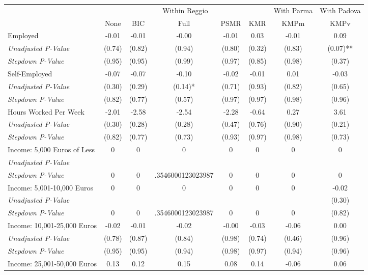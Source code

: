 \begin{tabular}{l c c c c c c c}
\toprule
& \multicolumn{5}{c}{Within Reggio} & With Parma & With Padova \\\cmidrule(lr){2-6} \cmidrule(lr){7-7} \cmidrule(lr){8-8}
 & None & BIC & Full & PSMR & KMR & KMPm & KMPv \\
\midrule
Employed & -0.01 & -0.01 & -0.00 & -0.01 & 0.03 & -0.01 & 0.09 \\
\quad \textit{Unadjusted P-Value} & (0.74) & (0.82) & (0.94) & (0.80) & (0.32) & (0.83) & (0.07)** \\
\quad \textit{Stepdown P-Value} & (0.95) & (0.95) & (0.99) & (0.97) & (0.85) & (0.98) & (0.37) \\
Self-Employed & -0.07 & -0.07 & -0.10 & -0.02 & -0.01 & 0.01 & -0.03 \\
\quad \textit{Unadjusted P-Value} & (0.30) & (0.29) & (0.14)* & (0.71) & (0.93) & (0.82) & (0.65) \\
\quad \textit{Stepdown P-Value} & (0.82) & (0.77) & (0.57) & (0.97) & (0.97) & (0.98) & (0.96) \\
Hours Worked Per Week & -2.01 & -2.58 & -2.54 & -2.28 & -0.64 & 0.27 & 3.61 \\
\quad \textit{Unadjusted P-Value} & (0.30) & (0.28) & (0.28) & (0.47) & (0.76) & (0.90) & (0.21) \\
\quad \textit{Stepdown P-Value} & (0.82) & (0.77) & (0.73) & (0.93) & (0.97) & (0.98) & (0.73) \\
Income: 5,000 Euros of Less & 0 & 0 & 0 & 0 & 0 & 0 & 0 \\
\quad \textit{Unadjusted P-Value} & & & & & & & \\
\quad \textit{Stepdown P-Value} & 0 & 0 & .3546000123023987 & 0 & 0 & 0 & 0 \\
Income: 5,001-10,000 Euros & 0 & 0 & 0 & 0 & 0 & 0 & -0.02 \\
\quad \textit{Unadjusted P-Value} & & & & & & & (0.30) \\
\quad \textit{Stepdown P-Value} & 0 & 0 & .3546000123023987 & 0 & 0 & 0 & (0.82) \\
Income: 10,001-25,000 Euros & -0.02 & -0.01 & -0.02 & -0.00 & -0.03 & -0.06 & 0.00 \\
\quad \textit{Unadjusted P-Value} & (0.78) & (0.87) & (0.84) & (0.98) & (0.74) & (0.46) & (0.96) \\
\quad \textit{Stepdown P-Value} & (0.95) & (0.95) & (0.94) & (0.98) & (0.97) & (0.94) & (0.96) \\
Income: 25,001-50,000 Euros & 0.13 & 0.12 & 0.15 & 0.08 & 0.14 & -0.06 & 0.06 \\

\end{tabular}
